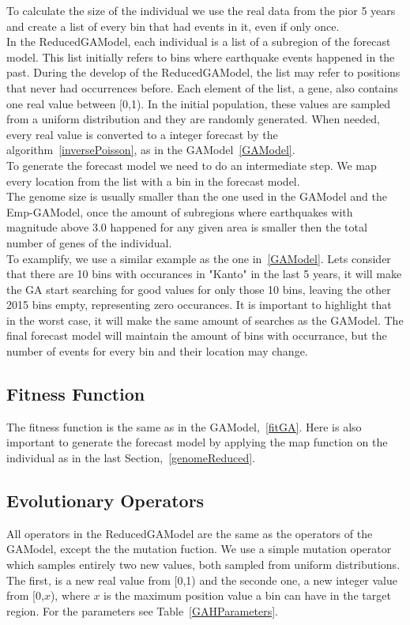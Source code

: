 To calculate the size of the individual we use the real data from the pior 5 years and create a list of every bin that had events in it, even if only once.\\

In the ReducedGAModel, each individual is a list of a subregion of the forecast model. This list initially refers to bins where earthquake events happened in the past. During the develop of the ReducedGAModel, the list may refer to positions that never had occurrences before. Each element of the list, a gene, also contains one real value between [0,1). In the initial population, these values are sampled from a uniform distribution and they are randomly generated. When needed, every real value is converted to a integer forecast by the algorithm~\ref{inversePoisson}, as in the GAModel~\ref{GAModel}.\\

To generate the forecast model we need to do an intermediate step. We map every location from the list with a bin in the forecast model.\\

The genome size is usually smaller than the one used in the GAModel and the Emp-GAModel, once the amount of subregions where earthquakes with magnitude above 3.0 happened for any given area is smaller then the total number of genes of the individual.\\

To examplify, we use a similar example as the one in~\ref{GAModel}. Lets consider that there are 10 bins with occurances in "Kanto" in the last 5 years, it will make the GA start searching for good values for only those 10 bins, leaving the other 2015 bins empty, representing zero occurances. It is important to highlight that in the worst case, it will make the same amount of searches as the GAModel. The final forecast model will maintain the amount of bins with occurrance, but the number of events for every bin and their location may change.\\
\subsection{Fitness Function}
The fitness function is the same as in the GAModel,~\ref{fitGA}. Here is also important to generate the forecast model by applying the map function on the individual as in the last Section,~\ref{genomeReduced}.\\

\subsection{Evolutionary Operators}\label{gaOperators}
All operators in the ReducedGAModel are the same as the operators of the GAModel, except the the mutation fuction. We use a simple mutation operator which samples entirely two new values, both sampled from uniform distributions. The first, is a new real value from [0,1) and the seconde one, a new integer value from [0,$x$), where $x$ is the maximum position value a bin can have in the target region. For the parameters see Table~\ref{GAHParameters}.


